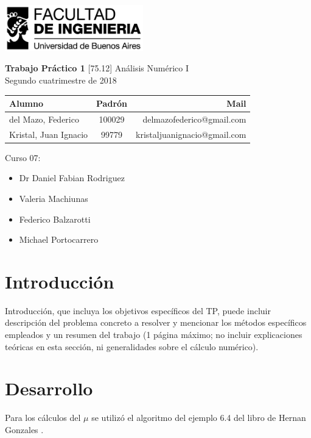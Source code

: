 \documentclass[11pt,a4paper]{article}
\begin{document}
\begin{titlepage}
	\hfill\includegraphics[width=6cm]{fiuba.jpg}
    \begin{center}
    \vfill
    \Huge \textbf{Trabajo Práctico 1}
    \vskip2cm
    \Large [75.12] Análisis Numérico I\\
    Segundo cuatrimestre de 2018
    \vfill
    \begin{tabular}{|l|c|r|}
	\hline
	Alumno & Padrón & Mail\\
	\hline
	\hline
	del Mazo, Federico & 100029 & delmazofederico@gmail.com\\
	\hline
	Kristal, Juan Ignacio & 99779 & kristaljuanignacio@gmail.com\\
	\hline
	\end{tabular}
    \vskip2cm
    \end{center}

    Curso 07:

    \begin{itemize}
    \item Dr Daniel Fabian Rodriguez
    \item Valeria Machiunas
    \item Federico Balzarotti
    \item Michael Portocarrero
    \end{itemize}

\end{titlepage}



\tableofcontents
\thispagestyle{onlyheader}
\newpage


\setcounter{page}{1}

\section{Introducción}
Introducción, que incluya los objetivos específicos del TP, puede incluir descripción del
problema concreto a resolver y mencionar los métodos específicos empleados y un resumen del
trabajo (1 página máximo; no incluir explicaciones teóricas en esta sección, ni generalidades
sobre el cálculo numérico).

\section{Desarrollo}
Para los cálculos del \(\mu\) se utilizó el algoritmo del ejemplo 6.4 del libro de Hernan Gonzales \cite{Gonzales}.
 
\end{document}
